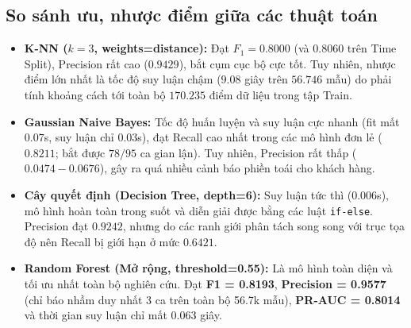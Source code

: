 \documentclass[13pt,a4paper]{extarticle}
\begin{document}
\subsection{So sánh ưu, nhược điểm giữa các thuật toán}
\begin{itemize}
    \item \textbf{K-NN ($k=3$, weights=distance):} Đạt $F_1 = 0.8000$ (và $0.8060$ trên Time Split), Precision rất cao ($0.9429$), bắt cụm cục bộ cực tốt. Tuy nhiên, nhược điểm lớn nhất là tốc độ suy luận chậm ($9.08$ giây trên $56.746$ mẫu) do phải tính khoảng cách tới toàn bộ $170.235$ điểm dữ liệu trong tập Train.
    \item \textbf{Gaussian Naive Bayes:} Tốc độ huấn luyện và suy luận cực nhanh (fit mất $0.07$s, suy luận chỉ $0.03$s), đạt Recall cao nhất trong các mô hình đơn lẻ ($0.8211$; bắt được $78/95$ ca gian lận). Tuy nhiên, Precision rất thấp ($0.0474 - 0.0676$), gây ra quá nhiều cảnh báo phiền toái cho khách hàng.
    \item \textbf{Cây quyết định (Decision Tree, depth=6):} Suy luận tức thì ($0.006$s), mô hình hoàn toàn trong suốt và diễn giải được bằng các luật \texttt{if-else}. Precision đạt $0.9242$, nhưng do các ranh giới phân tách song song với trục tọa độ nên Recall bị giới hạn ở mức $0.6421$.
    \item \textbf{Random Forest (Mở rộng, threshold=0.55):} Là mô hình toàn diện và tối ưu nhất toàn bộ nghiên cứu. Đạt \textbf{F1 = 0.8193}, \textbf{Precision = 0.9577} (chỉ báo nhầm duy nhất 3 ca trên toàn bộ 56.7k mẫu), \textbf{PR-AUC = 0.8014} và thời gian suy luận chỉ mất $0.063$ giây.
\end{itemize}
\end{document}
